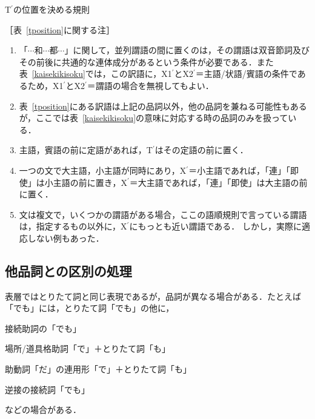 \begin{table}[p]
\begin{center}
\vspace*{-2em}
\caption{T$^{\prime}$の位置を決める規則}
\label{tposition}
\end{center}
{\scriptsize
［表~\ref{tposition}に関する注］
\renewcommand{\labelenumi}{}
\begin{enumerate}
 \setlength{\labelwidth}{15pt}
 \item 「$\cdots$和$\cdots$都$\cdots$」に関して，並列謂語の間に置くのは，その謂語は双音節詞及びその前後に共通的な連体成分があるという条件が必要である．また表~\ref{kaisekikisoku}では，この訳語に，X1$^{\prime}$とX2$^{\prime}$＝主語/状語/賓語の条件であるため，X1$^{\prime}$とX2$^{\prime}$＝謂語の場合を無視してもよい．
 \item 表~\ref{tposition}にある訳語は上記の品詞以外，他の品詞を兼ねる可能性もあるが，ここでは表~\ref{kaisekikisoku}の意味に対応する時の品詞のみを扱っている．
 \item 主語，賓語の前に定語があれば，T$^{\prime}$はその定語の前に置く．
 \item 一つの文で大主語，小主語が同時にあり，X$^{\prime}$＝小主語であれば，「連」「即使」は小主語の前に置き，X$^{\prime}$＝大主語であれば，「連」「即使」は大主語の前に置く．
 \item 文は複文で，いくつかの謂語がある場合，ここの語順規則で言っている謂語は，指定するもの以外に，X$^{\prime}$にもっとも近い謂語である． しかし，実際に適応しない例もあった．
\end{enumerate}
}
\end{table}
\renewcommand{\labelenumi}{}

\subsection{他品詞との区別の処理}
表層ではとりたて詞と同じ表現であるが，品詞が異なる場合がある．たとえば「でも」には，とりたて詞「でも」の他に，

\renewcommand{\theenumi}{}
\begin{enumerates}
 \item 接続助詞の「でも」
 \item 場所/道具格助詞「で」＋とりたて詞「も」
 \item 助動詞「だ」の連用形「で」＋とりたて詞「も」
 \item 逆接の接続詞「でも」
\end{enumerates}
などの場合がある．


